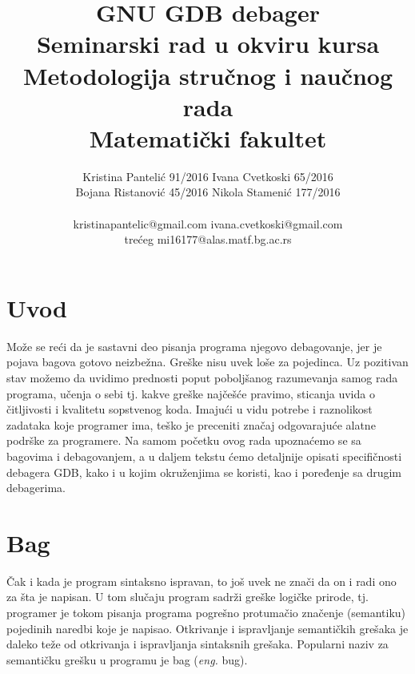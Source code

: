 \documentclass[a4paper]{article}
\begin{document}
\title{GNU GDB debager\\ \small{Seminarski rad u okviru kursa\\Metodologija stručnog i naučnog rada\\ Matematički fakultet}}

\author{Kristina Pantelić 91/2016 
Ivana Cvetkoski 65/2016\\
Bojana Ristanović 45/2016 
Nikola Stamenić 177/2016\\ 
\\kristinapantelic@gmail.com  
ivana.cvetkoski@gmail.com\\
trećeg 
mi16177@alas.matf.bg.ac.rs}


\maketitle


\tableofcontents

\newpage

\section{Uvod}
\label{sec:uvod}

Može se reći da je sastavni deo pisanja programa njegovo
debagovanje, jer je pojava bagova gotovo neizbežna. Greške nisu uvek
loše za pojedinca. Uz pozitivan stav možemo da uvidimo prednosti
poput poboljšanog razumevanja samog rada programa, učenja o sebi
tj. kakve greške najčešće pravimo, sticanja uvida o čitljivosti i
kvalitetu sopstvenog koda. Imajući u vidu potrebe i raznolikost
zadataka koje programer ima, teško je preceniti značaj odgovarajuće
alatne podrške za programere. Na samom početku ovog rada
upoznaćemo se sa bagovima i debagovanjem, a u daljem tekstu ćemo
detaljnije opisati specifičnosti debagera GDB, kako i u kojim
okruženjima se koristi, kao i poređenje sa drugim debagerima.

\section{Bag}
\label{sec:bag}
Čak i kada je program sintaksno ispravan, to još uvek ne znači da on i radi ono za šta je napisan. 
U tom slučaju program sadrži greške logičke prirode, tj. programer je tokom pisanja programa 
pogrešno protumačio značenje (semantiku) pojedinih naredbi koje je napisao. Otkrivanje i ispravljanje
semantičkih grešaka je daleko teže od otkrivanja i ispravljanja sintaksnih grešaka. 
Popularni naziv za semantičku grešku u programu je bag (\textit{eng.} bug).
\end{document}
